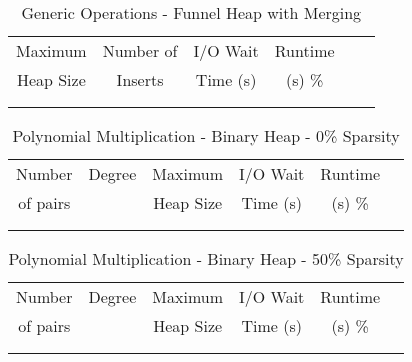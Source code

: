 \documentclass[11pt, one-sided]{amsart}
\begin{document}
\begin{table}[htbp]
   \centering
      \caption{Generic Operations - Funnel Heap with Merging}
   \begin{tabular}{|c|c|c|c|c|c|}
   	\hline
		 Maximum   	& 	Number of 	& I/O Wait		& Runtime 	 \\ 
		 Heap Size		&	Inserts	& Time (s)		&	(s)		 		\%		\\ \hline	
		 			&				&			&						\\
		 			&				&			&						\\
   \end{tabular}
   \label{tab:booktabs}
\end{table}


\newpage


\begin{table}[htbp]
   \centering
      \caption{Polynomial Multiplication - Binary Heap - 0\% Sparsity}
   \begin{tabular}{|c|c|c|c|c|c|}
   	\hline
		 Number   & 	Degree	& Maximum & I/O Wait		& Runtime 	 \\ 
		 of pairs 	&			& Heap Size	& Time (s)		&	(s)		\%				\\ \hline
		 		&			&			&			&						\\
		 		&			&			&			&						\\
   \end{tabular}
   \label{tab:booktabs}
\end{table}

\begin{table}[htbp]
   \centering
      \caption{Polynomial Multiplication - Binary Heap - 50\% Sparsity}
   \begin{tabular}{|c|c|c|c|c|c|}
   	\hline
		 Number   & 	Degree	& Maximum & I/O Wait		& Runtime 	 \\ 
		 of pairs 	&			& Heap Size	& Time (s)		&	(s)		 		\%				\\ \hline
		 		&			&			&			&						\\
		 		&			&			&			&						\\
   \end{tabular}
   \label{tab:booktabs}
\end{table}
\end{document}
